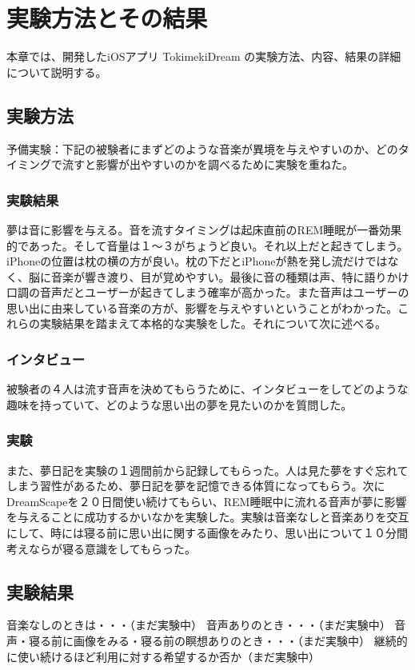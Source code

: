 \chapter{実験方法とその結果}
\label{chap:ledoxea}

本章では、開発したiOSアプリ TokimekiDream の実験方法、内容、結果の詳細について説明する。

\section{実験方法}
予備実験：下記の被験者にまずどのような音楽が異境を与えやすいのか、どのタイミングで流すと影響が出やすいのかを調べるために実験を重ねた。

\subsection{実験結果}
夢は音に影響を与える。音を流すタイミングは起床直前のREM睡眠が一番効果的であった。そして音量は１〜３がちょうど良い。それ以上だと起きてしまう。iPhoneの位置は枕の横の方が良い。枕の下だとiPhoneが熱を発し流だけではなく、脳に音楽が響き渡り、目が覚めやすい。最後に音の種類は声、特に語りかけ口調の音声だとユーザーが起きてしまう確率が高かった。また音声はユーザーの思い出に由来している音楽の方が、影響を与えやすいということがわかった。これらの実験結果を踏まえて本格的な実験をした。それについて次に述べる。

\subsection{インタビュー}
被験者の４人は流す音声を決めてもらうために、インタビューをしてどのような趣味を持っていて、どのような思い出の夢を見たいのかを質問した。

\subsection{実験}
また、夢日記を実験の１週間前から記録してもらった。人は見た夢をすぐ忘れてしまう習性があるため、夢日記を夢を記憶できる体質になってもらう。次に
DreamScapeを２０日間使い続けてもらい、REM睡眠中に流れる音声が夢に影響を与えることに成功するかいなかを実験した。実験は音楽なしと音楽ありを交互にして、時には寝る前に思い出に関する画像をみたり、思い出について１０分間考えならが寝る意識をしてもらった。

\section{実験結果}
音楽なしのときは・・・（まだ実験中）
音声ありのとき・・・（まだ実験中）
音声・寝る前に画像をみる・寝る前の瞑想ありのとき・・・（まだ実験中）
継続的に使い続けるほど利用に対する希望するか否か（まだ実験中）
